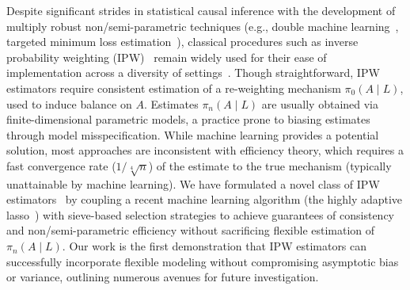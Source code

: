 Despite significant strides in statistical causal inference with the development
of multiply robust non/semi-parametric techniques (e.g., double machine
learning~\citep{chernozhukov2017double, chernozhukov2018double}, targeted
minimum loss estimation~\citep{vdl2006targeted, vdl2011targeted,
vdl2018targeted}), classical procedures such as inverse probability weighting
(IPW)~\citep{horvitz1952generalization, rosenbaum1983central, hernan2020causal}
remain widely used for their ease of implementation across a diversity of
settings~\citep{hernan2020causal}. Though straightforward, IPW estimators
require consistent estimation of a re-weighting mechanism $\pi_0(A \mid L)$,
used to induce balance on $A$. Estimates $\pi_n(A \mid L)$ are usually obtained
via finite-dimensional parametric models, a practice prone to biasing estimates
through model misspecification. While machine learning provides a potential
solution, most approaches are inconsistent with efficiency theory, which
requires a fast convergence rate ($1/\sqrt[4]{n}$) of the estimate
to the true mechanism (typically unattainable by machine learning). We have
formulated a novel class of IPW estimators~\citep{ertefaie2020nonparametric} by
coupling a recent machine learning algorithm (the highly adaptive
lasso~\citep{benkeser2016highly, vdl2017generally, bibaut2019fast,
hejazi2020hal9001}) with sieve-based selection strategies to achieve guarantees
of consistency and non/semi-parametric efficiency without sacrificing flexible
estimation of $\pi_n(A \mid L)$. Our work is the first demonstration that IPW
estimators can successfully incorporate flexible modeling without compromising
asymptotic bias or variance, outlining numerous avenues for future
investigation.

